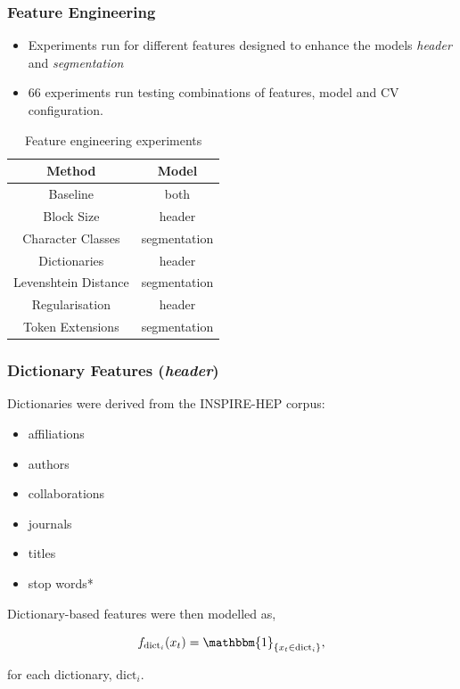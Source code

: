 \documentclass{beamer}
\begin{document}
\begin{frame}
\frametitle{Feature Engineering}

\begin{itemize}
\item Experiments run for different features designed to enhance the models \emph{header} and \emph{segmentation}
\item 66 experiments run testing combinations of features, model and CV configuration.
\end{itemize}

\begin{table}[h]
\begin{center}
\begin{tabular}{|c|c|}
\hline
Method & Model \\
\hline
Baseline & both \\
\hline
Block Size & {header} \\
\hline
Character Classes & {segmentation} \\
\hline
Dictionaries & {header} \\
\hline
Levenshtein Distance & {segmentation} \\
\hline
Regularisation & {header} \\
\hline
Token Extensions & {segmentation} \\
\hline
\end{tabular}
\caption[]{Feature engineering experiments}
\end{center}
\end{table}
\end{frame}


\begin{frame}
\frametitle{Dictionary Features (\emph{header})}

Dictionaries were derived from the INSPIRE-HEP corpus:

\begin{itemize}
\item affiliations
\item authors
\item collaborations
\item journals
\item titles
\item stop words*
\end{itemize}

Dictionary-based features were then modelled as,

$$
f_{\text{dict}_i}(x_t) = \mathbbm{1}_{\{x_t \in \text{dict}_i\}},
$$

for each dictionary, $\text{dict}_i$.

\end{frame}
\end{document}
